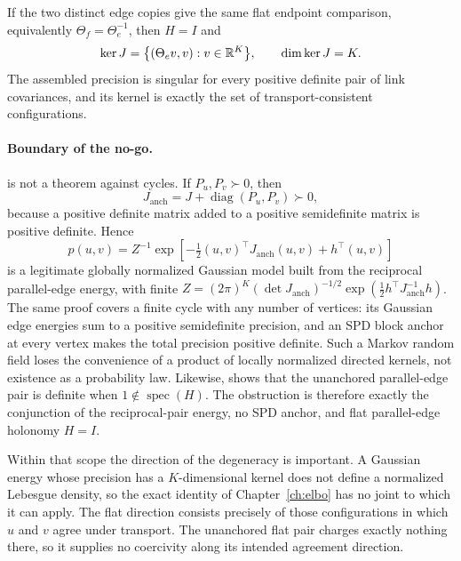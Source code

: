 If the two distinct edge copies give the same flat endpoint comparison,
equivalently \(\Theta_f=\Theta_e^{-1}\), then \(H=I\) and
\begin{equation}
\ker J=\bigl\{(\Theta_ev, v):v\in\mathbb R^{K}\bigr\},
\qquad
\dim\ker J=K .
\label{eq:obs-cocycle-kernel}
\end{equation}
The assembled precision is singular for every positive definite pair of link covariances, and its kernel is exactly the set of transport-consistent configurations.

\paragraph{Boundary of the no-go.}
 is not a theorem against cycles. If \(P_u,P_v\succ0\), then
\begin{equation}
J_{\mathrm{anch}}=J+\operatorname{diag}(P_u,P_v)\succ0,
\label{eq:obs-anchored-cycle}
\end{equation}
because a positive definite matrix added to a positive semidefinite matrix is positive definite. Hence
\[
p(u,v)=Z^{-1}\exp\left[-\tfrac12(u,v)^\top J_{\mathrm{anch}}(u,v)+h^\top(u,v)\right]
\]
is a legitimate globally normalized Gaussian model built from the reciprocal
parallel-edge energy, with finite
\(Z=(2\pi)^K(\det J_{\mathrm{anch}})^{-1/2}
\exp(\tfrac12h^\top J_{\mathrm{anch}}^{-1}h)\).
The same proof covers a finite cycle with any number of vertices: its Gaussian
edge energies sum to a positive semidefinite precision, and an SPD block
anchor at every vertex makes the total precision positive definite. Such a
Markov random field loses the convenience of a product of locally normalized
directed kernels, not existence as a probability law. Likewise,
 shows that the unanchored parallel-edge
pair is definite when \(1\notin\operatorname{spec}(H)\). The obstruction is
therefore exactly the conjunction of the reciprocal-pair energy, no SPD
anchor, and flat parallel-edge holonomy \(H=I\). 

Within that scope the direction of the degeneracy is important. A Gaussian energy whose precision has a $K$-dimensional kernel does not define a normalized Lebesgue density, so the exact identity of Chapter~\ref{ch:elbo} has no joint to which it can apply. The flat direction consists precisely of those configurations in which $u$ and $v$ agree under transport. The unanchored flat pair charges exactly nothing there, so it supplies no coercivity along its intended agreement direction.

